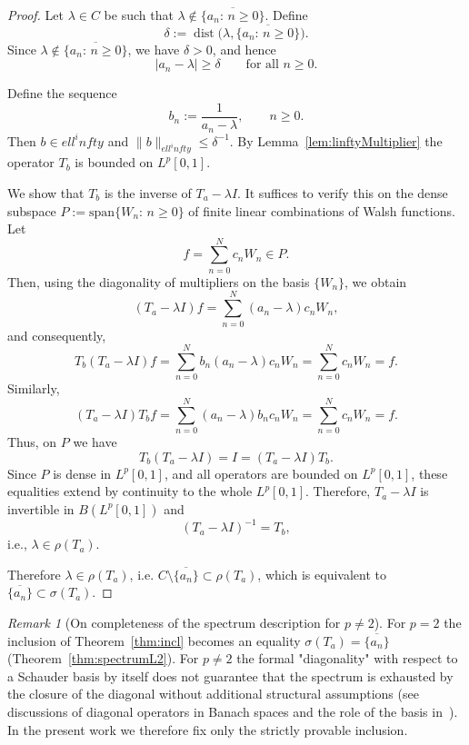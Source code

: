 \documentclass[a4paper,12pt]{article}
\theoremstyle{definition}
\theoremstyle{remark}
\newtheorem{remark}[theorem]{Remark}
\theoremstyle{definition}
\newcommand{\Lp}{L^p[0,1]}
\def\infty{infty}%
\def\ell{ell}%
\def\mathbb#1{#1}%
\def\mathcal#1{#1}%
\begin{document}
\begin{proof}
Let $\lambda\in\mathbb{C}$ be such that $\lambda\notin \overline{\{a_n:\,n\ge0\}}$.
Define
\[
\delta:=\operatorname{dist}\!\bigl(\lambda,\overline{\{a_n:\,n\ge0\}}\bigr).
\]
Since $\lambda\notin \overline{\{a_n:\,n\ge0\}}$, we have $\delta>0$, and hence
\[
|a_n-\lambda|\ge \delta \qquad \text{for all }n\ge0.
\]

Define the sequence
\[
b_n:=\frac{1}{a_n-\lambda},\qquad n\ge0.
\]
Then $b\in \ell^\infty$ and $\|b\|_{\ell^\infty}\le \delta^{-1}$.
By Lemma~\ref{lem:linftyMultiplier} the operator $T_b$ is bounded on $\Lp$.

We show that $T_b$ is the inverse of $T_a-\lambda I$.
It suffices to verify this on the dense subspace
$\mathcal{P}:=\mathrm{span}\{W_n:\,n\ge0\}$ of finite linear combinations of Walsh functions.
Let
\[
f=\sum_{n=0}^N c_n W_n\in\mathcal{P}.
\]
Then, using the diagonality of multipliers on the basis $\{W_n\}$, we obtain
\[
(T_a-\lambda I)f=\sum_{n=0}^N (a_n-\lambda)c_n W_n,
\]
and consequently,
\[
T_b(T_a-\lambda I)f
=\sum_{n=0}^N b_n(a_n-\lambda)c_n W_n
=\sum_{n=0}^N c_n W_n=f.
\]
Similarly,
\[
(T_a-\lambda I)T_b f
=\sum_{n=0}^N (a_n-\lambda)b_n c_n W_n
=\sum_{n=0}^N c_n W_n=f.
\]
Thus, on $\mathcal{P}$ we have
\[
T_b(T_a-\lambda I)=I=(T_a-\lambda I)T_b.
\]
Since $\mathcal{P}$ is dense in $\Lp$, and all operators are bounded on $\Lp$,
these equalities extend by continuity to the whole $\Lp$.
Therefore, $T_a-\lambda I$ is invertible in $\mathcal{B}(\Lp)$ and
\[
(T_a-\lambda I)^{-1}=T_b,
\]
i.e., $\lambda\in\rho(T_a)$.

Therefore $\lambda\in\rho(T_a)$, i.e. $\mathbb{C}\setminus \overline{\{a_n\}}\subset \rho(T_a)$,
which is equivalent to $\overline{\{a_n\}}\subset \sigma(T_a)$.


\end{proof}

\begin{remark}[On completeness of the spectrum description for $p\neq2$]
For $p=2$ the inclusion of Theorem~\ref{thm:incl} becomes an equality
$\sigma(T_a)=\overline{\{a_n\}}$ (Theorem~\ref{thm:spectrumL2}).
For $p\neq2$ the formal "diagonality" with respect to a Schauder basis by itself
does not guarantee that the spectrum is exhausted by the closure of the diagonal without additional structural assumptions
(see discussions of diagonal operators in Banach spaces and the role of the basis in~\cite{Conway,DunfordSchwartz,LT,Wojtaszczyk}).
In the present work we therefore fix only the strictly provable inclusion.
\end{remark}
\end{document}
